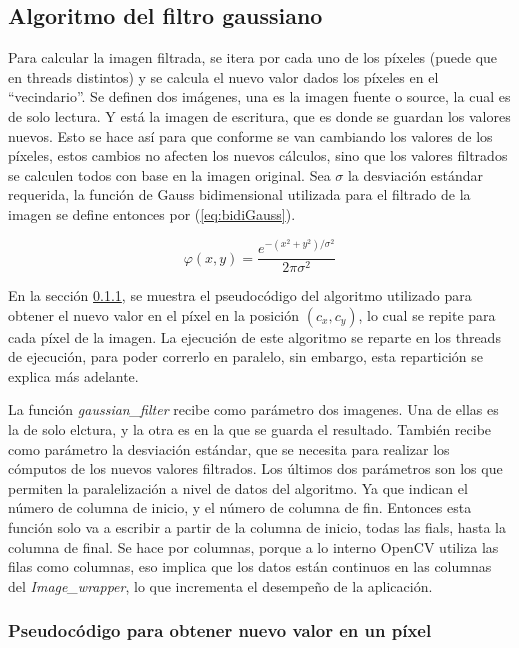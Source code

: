 \documentclass {article}
\begin{document}
\subsection{Algoritmo del filtro gaussiano}

Para calcular la imagen filtrada, se itera por cada uno de los píxeles (puede que en threads
distintos) y se calcula el nuevo valor dados los píxeles en el ``vecindario''. Se definen dos
imágenes, una es la imagen fuente o source, la cual es de solo lectura. Y está la imagen de
escritura, que es donde se guardan los valores nuevos. Esto se hace así para que conforme se van
cambiando los valores de los píxeles, estos cambios no afecten los nuevos cálculos, sino que los
valores filtrados se calculen todos con base en la imagen original. Sea $\sigma$ la desviación
estándar requerida, la función de Gauss bidimensional utilizada para el filtrado de la imagen se
define entonces por (\ref{eq:bidiGauss}).

\begin{equation} %
  \varphi (x, y)= \frac{e^{-(x^2+y^2)/\sigma^2}}{2\pi \sigma^2} 
  \label{eq:bidiGauss}
\end{equation}

En la sección \ref{sec:pseudocodePixel}, se muestra el pseudocódigo del algoritmo utilizado para
obtener el nuevo valor en el píxel en la posición $(c_x, c_y)$, lo cual se repite para cada píxel de
la imagen. La ejecución de este algoritmo se reparte en los threads de ejecución, para poder
correrlo en paralelo, sin embargo, esta repartición se explica más adelante.

La función \textit{gaussian\_filter} recibe como parámetro dos imagenes. Una de ellas es la de solo
elctura, y la otra es en la que se guarda el resultado. También recibe como parámetro la desviación
estándar, que se necesita para realizar los cómputos de los nuevos valores filtrados. Los últimos
dos parámetros son los que permiten la paralelización a nivel de datos del algoritmo. Ya que indican
el número de columna de inicio, y el número de columna de fin. Entonces esta función solo va a
escribir a partir de la columna de inicio, todas las fials, hasta la columna de final. Se hace por
columnas, porque a lo interno OpenCV utiliza las filas como columnas, eso implica que los datos
están continuos en las columnas del \textit{Image\_wrapper}, lo que incrementa el desempeño de la
aplicación.  


\subsubsection{Pseudocódigo para obtener nuevo valor en un píxel}
\label{sec:pseudocodePixel}
\end{document}
